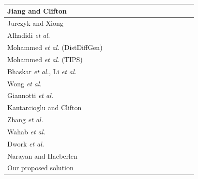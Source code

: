 \documentclass[USenglish,oneside,twocolumn]{article}
\begin{document}
\begin{table}[!t]
{\begin{tabular}{|p{5.7cm}|p{1.0cm}|p{0.7cm}|p{1.4cm}|p{1.1cm}|p{1.4cm}|p{1.1cm}|p{0.7cm}|p{0.8cm}|p{0.6cm}|p{0.8cm}|p{0.6cm}|p{1.1cm}|p{1.5cm}|}
            \hline
            Jiang and Clifton &  &  \centering{$\CIRCLE$} &  & \centering{$\CIRCLE$} &  &  &  &  & \centering{$\CIRCLE$} &  &  & \centering{$\Circle$} &  \tabularnewline
            \hline
            Jurczyk and Xiong &  &  \centering{$\CIRCLE$} &  & \centering{$\CIRCLE$} &  &  &  &  &  & \centering{$\CIRCLE$} &  & \centering{$\Circle$} &  \tabularnewline
            \hline
            Alhadidi \emph{et al.} &  &  \centering{$\CIRCLE$} & \centering{$\CIRCLE$} &  &  &  &  & \centering{$\CIRCLE$} &  &  &  & \centering{$\Circle$} &  \tabularnewline
            \hline
            Mohammed \emph{et al.} (DistDiffGen) &  & \centering{$\CIRCLE$} & \centering{$\CIRCLE$} &  &  &  &  &  & \centering{$\CIRCLE$} &  &  & \centering{$\Circle$} &  \tabularnewline
            \hline
            Mohammed \emph{et al.} (TIPS) &  & \centering{$\CIRCLE$} &  & \centering{$\CIRCLE$} &  &  &  &  & \centering{$\CIRCLE$} &  &  & \centering{$\CIRCLE$} &  \tabularnewline
            \hline
            Bhaskar \emph{et al.}, Li \emph{et al.} & \centering{$\CIRCLE$} &  &  &  & \centering{$\CIRCLE$} &  & \centering{$\CIRCLE$} &  &  &  &  &  &  \tabularnewline
            \hline
            Wong \emph{et al.}  & \centering{$\CIRCLE$} &  &  &  &  &  & \centering{$\CIRCLE$} &  &  &  &  & \centering{$\Circle$} &  \tabularnewline
            \hline
            Giannotti \emph{et al.} & \centering{$\CIRCLE$} &  &  &  &  & \centering{$\CIRCLE$} & \centering{$\CIRCLE$} &  &  &  &  & \centering{$\Circle$} &  \tabularnewline
            \hline
            Kantarcioglu and Clifton & \centering{$\CIRCLE$} &  &  &  &  &  &  &  &  & \centering{$\CIRCLE$} &  & \centering{$\Circle$} &  \tabularnewline
            \hline
            Zhang \emph{et al.} & \centering{$\CIRCLE$} &  &  &  &  &  &  & \centering{$\CIRCLE$} &  &  &  & \centering{$\Circle$} &  \tabularnewline
            \hline
            Wahab \emph{et al.} & \centering{$\CIRCLE$} &  &  &  & \centering{$\CIRCLE$} &  &  & \centering{$\CIRCLE$} &  & \centering{$\CIRCLE$} &  & \centering{$\Circle$} &  \tabularnewline
            \hline
            Dwork \emph{et al.} &  & \centering{$\CIRCLE$} &  &  & \centering{$\CIRCLE$} &  &  &  &  & \centering{$\CIRCLE$} &  & \centering{$\CIRCLE$} &  \tabularnewline
            \hline
            Narayan and Haeberlen &  & \centering{$\CIRCLE$} &  &  & \centering{$\CIRCLE$} &  &  & \centering{$\CIRCLE$} & & \centering{$\CIRCLE$} &  & \centering{$\Circle$} &  \tabularnewline
            \hline\hline
            Our proposed solution &  \centering{$\CIRCLE$} &  &  \centering{$\CIRCLE$} &  &  &  &  & \centering{$\CIRCLE$} & \centering{$\CIRCLE$} & \centering{$\CIRCLE$} & \centering{$\CIRCLE$} & \centering{$\CIRCLE$} & \centering{$\CIRCLE$} \tabularnewline

\end{tabular}}
\end{table}
\end{document}
